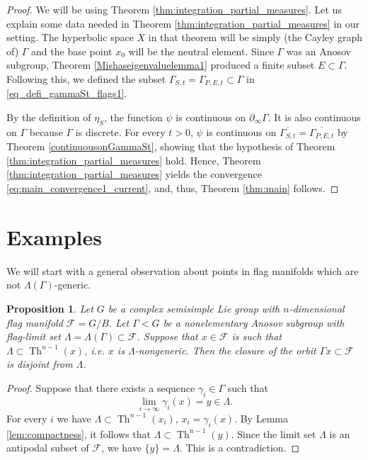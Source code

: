 \documentclass[12pt]{amsbook}%
\newtheorem{prop}[thm]{Proposition}
\theoremstyle{definition}
\theoremstyle{remark}
\numberwithin{section}{chapter}
\numberwithin{subsection}{section}
\numberwithin{figure}{chapter}
\DeclareMathOperator{\Th}{Th}
\def\dyl{>0}
\def\cF{{\mathscr{F}}}
\def\Ga{\Gamma}
\def\ga{\gamma}
\def\La{\Lambda}
\def\geo{\partial_\infty}
\def\ol{\overline}
\begin{document}
{{\begin{proof}
We will be using Theorem \ref{thm:integration_partial_measures}. Let us explain some data needed in Theorem \ref{thm:integration_partial_measures} in our setting. The hyperbolic space $X$ in that theorem will be simply (the Cayley graph of) $\Gamma$ and the base point $x_0 $ will be 
the neutral element.
Since $\Gamma$ was an Anosov subgroup, Theorem \ref{Mishaseigenvaluelemma1} produced a finite subset $E \subset \Gamma$. 
 Following this, we defined the subset $\Gamma_{S,t} = \Gamma_{P,E,t}\subset \Ga$ in \eqref{eq_defi_gammaSt_flags1}.  

By the definition of $\eta_S$, the function $\psi$ is continuous on $\geo \Ga$. It is also continuous on $\Gamma$ because %
$\Gamma$ is discrete. For every $t\dyl$, $\psi$ is continuous on $ \overline{\Gamma_{S,t}} = \ol{\Gamma_{P,E,t}}$ by Theorem \ref{continuousonGammaSt}, showing that the hypothesis of Theorem \ref{thm:integration_partial_measures} hold. Hence, Theorem \ref{thm:integration_partial_measures} yields the convergence \eqref{eq:main_convergence1_current}, and, thus, Theorem \ref{thm:main} follows.
\end{proof}


















\section{Examples}\label{sec:examples}

We will start with a general observation about points in flag manifolds which are not $\La(\Ga)$-generic.  

\begin{prop}
Let $G$ be a complex semisimple Lie group with $n$-dimensional flag manifold $\cF=G/B$. Let 
$\Ga< G$ be a nonelementary Anosov subgroup with flag-limit set $\La=\La(\Ga)\subset \cF$. 
Suppose that $x\in \cF$ is such that $\La\subset \Th^{n-1}(x)$, i.e. $x$ is $\La$-nongeneric.  
Then the closure of the orbit $\Ga x\subset \cF$ is disjoint from $\La$. 
\end{prop}
\begin{proof} Suppose that there exists a sequence $\gamma_i\in \Ga$ such that 
$$
\lim_{i\to\infty} \ga_i(x)=y\in \La.$$ 
For every $i$ we have $\La\subset \Th^{n-1}(x_i)$, $x_i=\ga_i(x)$. By Lemma \ref{lem:compactness}, it follows that 
$\La\subset \Th^{n-1}(y)$. Since the limit set $\La$ is an antipodal subset of $\cF$, we have $\{y\}=\La$. This is a contradiction. 
\end{proof}

}}
\end{document}
